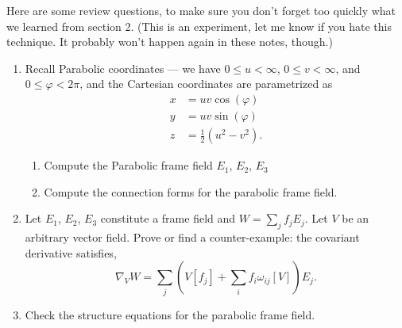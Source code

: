 

Here are some review questions, to make sure you don't forget too
quickly what we learned from section 2. (This is an experiment, let me
know if you hate this technique. It probably won't happen again in these
notes, though.)

\begin{enumerate}
\item Recall Parabolic coordinates --- we have $0\leq u<\infty$,
$0\leq v<\infty$, and $0\leq\varphi<2\pi$, and the Cartesian coordinates
  are parametrized as
  \begin{subequations}
    \begin{align}
      x &= uv\cos(\varphi)\\
      y &= uv\sin(\varphi)\\
      z &= \frac{1}{2}(u^{2}-v^{2}).
    \end{align}
  \end{subequations}
  \begin{enumerate}
  \item Compute the Parabolic frame field $E_{1}$, $E_{2}$, $E_{3}$
  \item Compute the connection forms for the parabolic frame field.
  \end{enumerate}
\item Let $E_{1}$, $E_{2}$, $E_{3}$ constitute a frame field and
  $W=\sum_{j}f_{j}E_{j}$. Let $V$ be an arbitrary vector field.
  Prove or find a counter-example: the covariant derivative satisfies,
\begin{equation}
\nabla_{V}W = \sum_{j}\left(V[f_{j}] + \sum_{i}f_{i}\omega_{ij}[V]\right)E_{j}.
\end{equation}
\item Check the structure equations for the parabolic frame field.
\end{enumerate}

